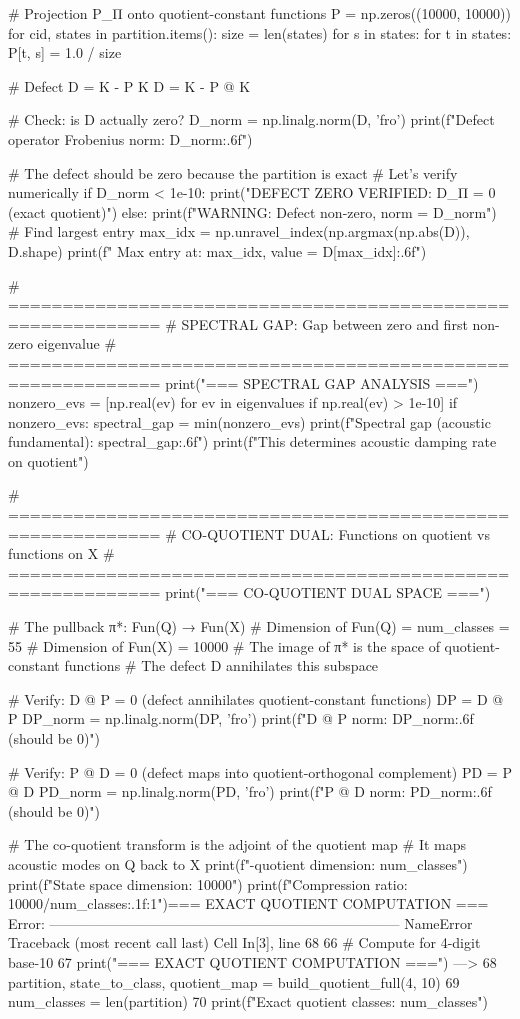 # Projection P_Π onto quotient-constant functions
P = np.zeros((10000, 10000))
for cid, states in partition.items():
    size = len(states)
    for s in states:
        for t in states:
            P[t, s] = 1.0 / size

# Defect D = K - P K
D = K - P @ K

# Check: is D actually zero?
D_norm = np.linalg.norm(D, 'fro')
print(f"Defect operator Frobenius norm: {D_norm:.6f}")

# The defect should be zero because the partition is exact
# Let's verify numerically
if D_norm < 1e-10:
    print("DEFECT ZERO VERIFIED: D_Π = 0 (exact quotient)")
else:
    print(f"WARNING: Defect non-zero, norm = {D_norm}")
    # Find largest entry
    max_idx = np.unravel_index(np.argmax(np.abs(D)), D.shape)
    print(f"  Max entry at: {max_idx}, value = {D[max_idx]:.6f}")

# ============================================================
# SPECTRAL GAP: Gap between zero and first non-zero eigenvalue
# ============================================================
print("\n=== SPECTRAL GAP ANALYSIS ===")
nonzero_evs = [np.real(ev) for ev in eigenvalues if np.real(ev) > 1e-10]
if nonzero_evs:
    spectral_gap = min(nonzero_evs)
    print(f"Spectral gap (acoustic fundamental): {spectral_gap:.6f}")
    print(f"This determines acoustic damping rate on quotient")

# ============================================================
# CO-QUOTIENT DUAL: Functions on quotient vs functions on X
# ============================================================
print("\n=== CO-QUOTIENT DUAL SPACE ===")

# The pullback π*: Fun(Q) → Fun(X)
# Dimension of Fun(Q) = num_classes = 55
# Dimension of Fun(X) = 10000
# The image of π* is the space of quotient-constant functions
# The defect D annihilates this subspace

# Verify: D @ P = 0 (defect annihilates quotient-constant functions)
DP = D @ P
DP_norm = np.linalg.norm(DP, 'fro')
print(f"D @ P norm: {DP_norm:.6f} (should be 0)")

# Verify: P @ D = 0 (defect maps into quotient-orthogonal complement)
PD = P @ D
PD_norm = np.linalg.norm(PD, 'fro')
print(f"P @ D norm: {PD_norm:.6f} (should be 0)")

# The co-quotient transform is the adjoint of the quotient map
# It maps acoustic modes on Q back to X
print(f"\nCo-quotient dimension: {num_classes}")
print(f"State space dimension: 10000")
print(f"Compression ratio: {10000/num_classes:.1f}:1")=== EXACT QUOTIENT COMPUTATION ===
Error:
---------------------------------------------------------------------------
NameError                                 Traceback (most recent call last)
Cell In[3], line 68
     66 # Compute for 4-digit base-10
     67 print("=== EXACT QUOTIENT COMPUTATION ===")
---> 68 partition, state_to_class, quotient_map = build_quotient_full(4, 10)
     69 num_classes = len(partition)
     70 print(f"Exact quotient classes: {num_classes}")

